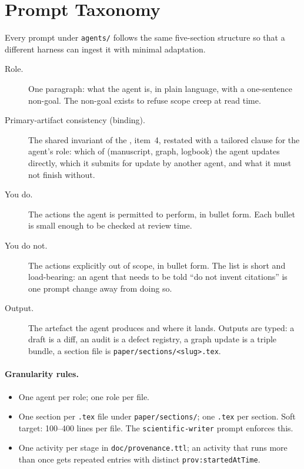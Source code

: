 \section{Prompt Taxonomy}
\label{sec:appendix-prompts}
\label{app:prompts}

Every prompt under \texttt{agents/} follows the same five-section
structure so that a different harness can ingest it with minimal
adaptation.

\begin{description}
    \item[Role.] One paragraph: what the agent is, in plain language,
        with a one-sentence non-goal. The non-goal exists to refuse
        scope creep at read time.
    \item[Primary-artifact consistency (binding).] The shared
        invariant of the , item~4, restated with a tailored
        clause for the agent's role: which of (manuscript, graph,
        logbook) the agent updates directly, which it submits
        for update by another agent, and what it must not finish
        without.
    \item[You do.] The actions the agent is permitted to perform, in
        bullet form. Each bullet is small enough to be checked at
        review time.
    \item[You do not.] The actions explicitly out of scope, in bullet
        form. The list is short and load-bearing: an agent that needs
        to be told ``do not invent citations'' is one prompt change
        away from doing so.
    \item[Output.] The artefact the agent produces and where it lands.
        Outputs are typed: a draft is a diff, an audit is a defect
        registry, a graph update is a triple bundle, a section file is
        \texttt{paper/sections/<slug>.tex}.
\end{description}

\paragraph{Granularity rules.}
\begin{itemize}
    \item One agent per role; one role per file.
    \item One section per \texttt{.tex} file under
        \texttt{paper/sections/}; one \texttt{.tex} per section. Soft
        target: 100--400 lines per file. The
        \texttt{scientific-writer} prompt enforces this.
    \item One activity per stage in \texttt{doc/provenance.ttl};
        an activity that runs more than once gets repeated entries
        with distinct \texttt{prov:startedAtTime}.
\end{itemize}

